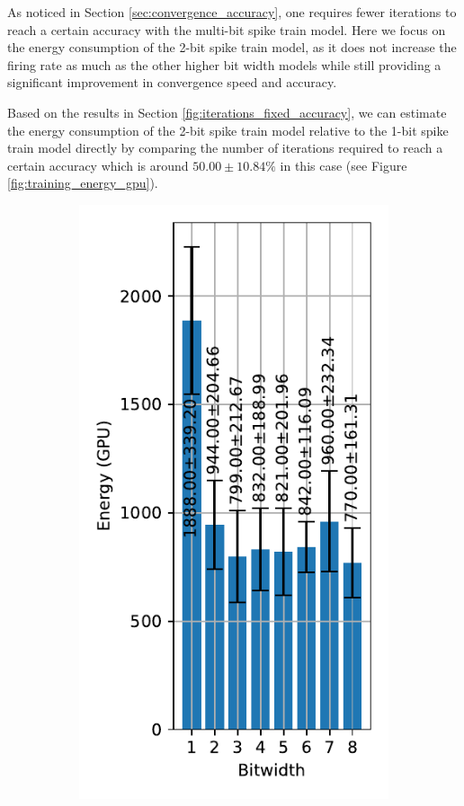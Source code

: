         As noticed in Section \ref{sec:convergence_accuracy}, one requires fewer iterations to reach a certain accuracy with the multi-bit spike train model. Here we focus on the energy consumption of the 2-bit spike train model, as it does not increase the firing rate as much as the other higher bit width models while still providing a significant improvement in convergence speed and accuracy. 

        Based on the results in Section \ref{fig:iterations_fixed_accuracy}, we can estimate the energy consumption of the 2-bit spike train model relative to the 1-bit spike train model directly by comparing the number of iterations required to reach a certain accuracy which is around $50.00\pm10.84\%$ in this case (see Figure \ref{fig:training_energy_gpu}). 
        \begin{figure}[!htpb]
            \centering
            \begin{subfigure}[H]{0.45\textwidth}
                \includegraphics[width=\textwidth]{../standard/FashionMNIST/plots/fashionmnist_train_energy_gpu.pdf}

\end{subfigure}
\end{figure}
